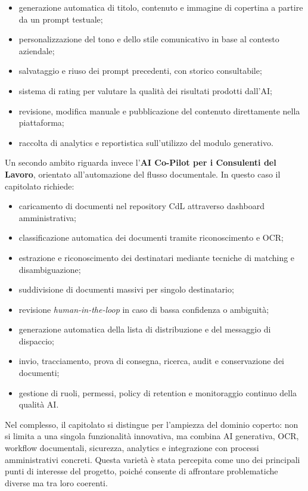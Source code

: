 \documentclass[a4paper,12pt]{article}
\begin{document}
\begin{itemize}
    \item generazione automatica di titolo, contenuto e immagine di copertina a partire da un prompt testuale;
    \item personalizzazione del tono e dello stile comunicativo in base al contesto aziendale;
    \item salvataggio e riuso dei prompt precedenti, con storico consultabile;
    \item sistema di rating per valutare la qualità dei risultati prodotti dall'AI;
    \item revisione, modifica manuale e pubblicazione del contenuto direttamente nella piattaforma;
    \item raccolta di analytics e reportistica sull'utilizzo del modulo generativo.
\end{itemize}

Un secondo ambito riguarda invece l'\textbf{AI Co-Pilot per i Consulenti del Lavoro}, orientato all'automazione del flusso documentale. In questo caso il capitolato richiede:

\begin{itemize}
    \item caricamento di documenti nel repository CdL attraverso dashboard amministrativa;
    \item classificazione automatica dei documenti tramite riconoscimento e OCR;
    \item estrazione e riconoscimento dei destinatari mediante tecniche di matching e disambiguazione;
    \item suddivisione di documenti massivi per singolo destinatario;
    \item revisione \textit{human-in-the-loop} in caso di bassa confidenza o ambiguità;
    \item generazione automatica della lista di distribuzione e del messaggio di dispaccio;
    \item invio, tracciamento, prova di consegna, ricerca, audit e conservazione dei documenti;
    \item gestione di ruoli, permessi, policy di retention e monitoraggio continuo della qualità AI.
\end{itemize}

Nel complesso, il capitolato si distingue per l'ampiezza del dominio coperto: non si limita a una singola funzionalità innovativa, ma combina AI generativa, OCR, workflow documentali, sicurezza, analytics e integrazione con processi amministrativi concreti. Questa varietà è stata percepita come uno dei principali punti di interesse del progetto, poiché consente di affrontare problematiche diverse ma tra loro coerenti.
\end{document}
